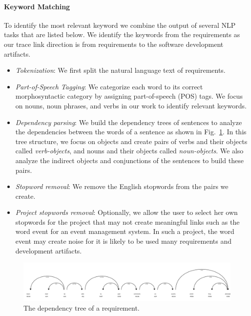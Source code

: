       \paragraph{Keyword Matching} To identify the most relevant keyword we combine the output of several NLP tasks that are listed below. We identify the keywords from the requirements as our trace link direction is from requirements to the software development artifacts.
      \begin{itemize}
      \item \textit{Tokenization}: We first split the natural language text of requirements.
      \item  \textit{Part-of-Speech Tagging}: We categorize each word to its correct morphosyntactic category by assigning part-of-speech (POS) tags. We focus on nouns, noun phrases, and verbs in our work to identify relevant keywords.

      \item  \textit{Dependency parsing}: We build the dependency trees of sentences to analyze the dependencies between the words of a sentence as shown in Fig.~\ref{fig:deptree}. In this tree structure, we focus on objects and create pairs of verbs and their objects called \emph{verb-objects}, and nouns and their objects called \emph{noun-objects}. We also analyze the indirect objects and conjunctions of the sentences to build these pairs.

      \item  \textit{Stopword removal}: We remove the English stopwords from the pairs we create.

      \item  \textit{Project stopwords removal}: Optionally, we allow the user to select her own stopwords for the project that may not create meaningful links such as the word event for an event management system. In such a project, the word event may create noise for it is likely to be used many requirements and development artifacts.
      \end{itemize}


\begin{figure}[htbp]
    \centering
    \includegraphics[width=1\linewidth]{figs/displacy.png}
    \caption{The dependency tree of a requirement.}
    \label{fig:deptree}
  \end{figure}

